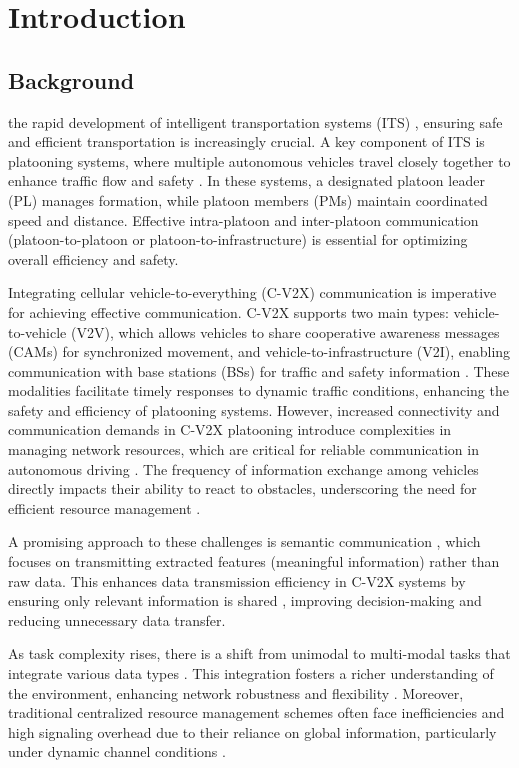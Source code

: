 \documentclass[10pt, lettersize,journal]{IEEEtran}
\begin{document}
	\IEEEpeerreviewmaketitle
	
	\section{Introduction}
	\subsection{Background}
	 the rapid development of intelligent transportation systems (ITS) \cite{r1}, ensuring safe and efficient transportation is increasingly crucial. A key component of ITS is platooning systems, where multiple autonomous vehicles travel closely together to enhance traffic flow and safety \cite{r3}. In these systems, a designated platoon leader (PL) manages formation, while platoon members (PMs) maintain coordinated speed and distance. Effective intra-platoon and inter-platoon communication (platoon-to-platoon or platoon-to-infrastructure) is essential for optimizing overall efficiency and safety.
	
	Integrating cellular vehicle-to-everything (C-V2X) communication is imperative for achieving effective communication. C-V2X supports two main types: vehicle-to-vehicle (V2V), which allows vehicles to share cooperative awareness messages (CAMs) for synchronized movement, and vehicle-to-infrastructure (V2I), enabling communication with base stations (BSs) for traffic and safety information \cite{r4}. These modalities facilitate timely responses to dynamic traffic conditions, enhancing the safety and efficiency of platooning systems. However, increased connectivity and communication demands in C-V2X platooning introduce complexities in managing network resources, which are critical for reliable communication in autonomous driving \cite{r5}. The frequency of information exchange among vehicles directly impacts their ability to react to obstacles, underscoring the need for efficient resource management \cite{r6,n5}.
	
	A promising approach to these challenges is semantic communication \cite{r7}, which focuses on transmitting extracted features (meaningful information) rather than raw data. This enhances data transmission efficiency in C-V2X systems by ensuring only relevant information is shared \cite{r8}, improving decision-making and reducing unnecessary data transfer.
	
	As task complexity rises, there is a shift from unimodal to multi-modal tasks that integrate various data types \cite{r9}. This integration fosters a richer understanding of the environment, enhancing network robustness and flexibility \cite{r10}. Moreover, traditional centralized resource management schemes often face inefficiencies and high signaling overhead due to their reliance on global information, particularly under dynamic channel conditions \cite{n1,r11,n3}.
	
\end{document}
